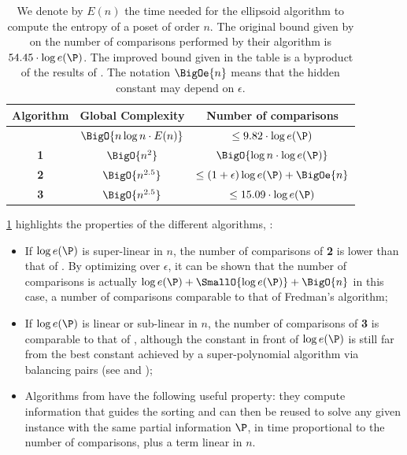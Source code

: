 \begin{table}
	\begin{center}
	\caption{We denote by $E(n)$ the time needed for the ellipsoid algorithm
to compute the entropy of a poset of order $n$. The original bound given by
\citet*{kahn:1995} on the number of comparisons performed by their algorithm is
$54.45 \cdot \log e(\P)$. The improved bound given in the table is a byproduct
of the results of \citet*{cardinal:2013}. The notation $\BigOe{n}$ means
that the hidden constant may depend on $\epsilon$.}
	\label{tree:supi:table/jcardin}
	\begin{tabular}{|c|c|c|}

	\hline
	Algorithm & Global Complexity & Number of comparisons\\\hline\hline
	\citet*{kahn:1995} & $\BigO{n \log n \cdot E(n)}$ & $\leq 9.82 \cdot \log
e(\P)$\\\hline\hline
	\citet*{cardinal:2013} \textbf{1} & $ \BigO{n^{2}} $ & $\BigO{\log n \cdot
\log e(\P)}$ \\\hline
	\citet*{cardinal:2013} \textbf{2} & $ \BigO{n^{2.5}} $ & $\leq (1 +
\epsilon) \log e(\P) + \BigOe{n}$ \\\hline
	\citet*{cardinal:2013} \textbf{3} & $ \BigO{n^{2.5}} $ & $\leq 15.09 \cdot
\log e(\P)$ \\\hline

	\end{tabular}
	\end{center}
\end{table}


\ref{tree:supi:table/jcardin} highlights the properties of the different
algorithms, \ie:
\begin{itemize}

\item If $\log e(\P)$ is super-linear in $n$, the number of comparisons of
\citet*{cardinal:2013} \textbf{2} is lower than that of \citet*{kahn:1995}. By
optimizing over $\epsilon$, it can be shown that the number of comparisons is
actually $\log e(\P) + \SmallO{\log e(\P)} + \BigO{n}$ in this case, a number of
comparisons comparable to that of Fredman’s algorithm;

\item If $\log e(\P)$ is linear or sub-linear in $n$, the number of comparisons
of \citet*{cardinal:2013} \textbf{3} is comparable to that of
\citet*{kahn:1995}, although the constant in front of $\log e(\P)$ is still far
from the best constant achieved by a super-polynomial algorithm via balancing
pairs (see \citet*{brightwell1995balancing} and
\citet*{brightwell1999balanced});

\item Algorithms from \citet*{cardinal:2013} have the following useful
property: they compute information that guides the sorting and can then be
reused to solve any given instance with the same partial information $\P$, in
time proportional to the number of comparisons, plus a term linear in $n$.

\end{itemize}

